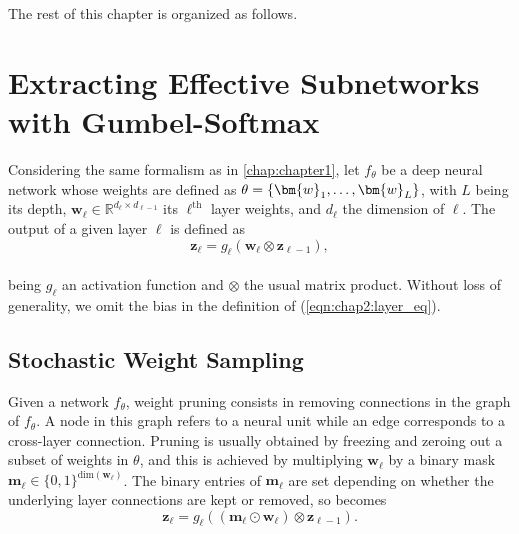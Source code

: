 The rest of this chapter is organized as follows.



\section{Extracting Effective Subnetworks with Gumbel-Softmax}

Considering the same formalism as in \cref{chap:chapter1}, let $f_\theta$ be a
deep neural network whose weights are defined as $\theta =
\left\{\bm{w}_1,\mathellipsis, \bm{w}_L \right\}$, with $L$ being its depth,
$\bm{w}_\ell \in \mathbb{R}^{d_{\ell} \times d_{\ell-1}}$ its $\ell^\textrm{th}$
layer weights, and $d_\ell$ the dimension of $\ell$. The output of a given layer
$\ell$ is defined as \\

\begin{equation}
  \label{eqn:chap2:layer_eq}
  \mathbf{z}_{\ell} = g_\ell(\bm{w}_\ell \otimes \mathbf{z}_{\ell-1}),
\end{equation}\\

being  $g_\ell$ an activation function and $\otimes$ the usual matrix product.
Without loss of generality, we omit the bias in the definition of
(\ref{eqn:chap2:layer_eq}).

\subsection{Stochastic Weight Sampling}
\label{sec:chap2:stochastic-sampling}
\indent Given a network $f_\theta$, weight pruning consists in removing
connections in the graph of $f_\theta$. A node in this graph refers to a
neural unit while an edge corresponds to a cross-layer connection. Pruning is
usually obtained by freezing and zeroing out  a subset of weights in $\theta$,
and this is achieved  by multiplying $\bm{w}_\ell$ by a binary mask
$\bm{m}_\ell \in \{ 0,1 \}^{\text{dim}(\bm{w}_\ell)}$. The
binary entries of $\bm{m}_\ell$ are set depending on whether the underlying
layer connections are kept or removed, so  becomes\\

\begin{equation}
  \label{eqn:chap2:pruned_layer_eq}
  \mathbf{z}_{\ell} = g_\ell( (\bm{m}_\ell \odot \bm{w}_\ell ) \otimes \mathbf{z}_{\ell-1} ).
\end{equation}\\

